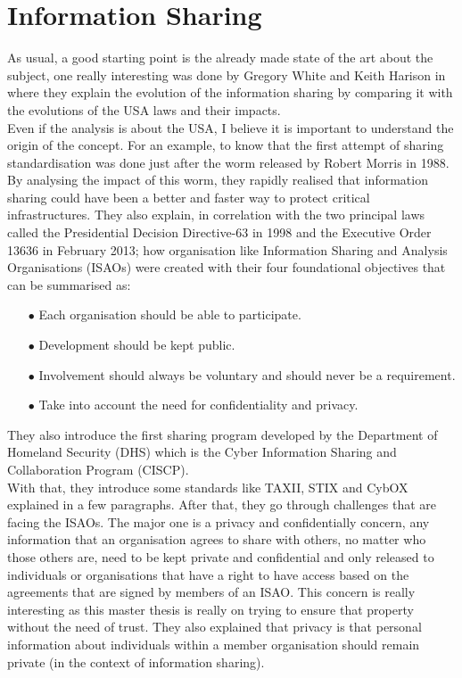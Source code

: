\documentclass{eplmastersthesis}
\begin{document}
\section{Information Sharing}
As usual, a good starting point is the already made state of the art about the subject, one really interesting was done by Gregory White and Keith Harison in \cite{white2017state} where they explain the evolution of the information sharing by comparing it with the evolutions of the USA laws and their impacts.\\
Even if the analysis is about the USA, I believe it is important to understand the origin of the concept. For an example, to know that the first attempt of sharing standardisation was done just after the worm released by Robert Morris in 1988.\\
By analysing the impact of this worm, they rapidly realised that information sharing could have been a better and faster way to protect critical infrastructures. They also explain, in correlation with the two principal laws called the Presidential Decision Directive-63 in 1998 and the Executive Order 13636 in February 2013; how organisation like Information Sharing and Analysis Organisations (ISAOs) were created with their four foundational objectives that can be summarised as:
\begin{itemize}
\item[$\bullet$] Each organisation should be able to participate.
\item[$\bullet$] Development should be kept public.
\item[$\bullet$] Involvement should always be voluntary and should never be a requirement.
\item[$\bullet$] Take into account the need for confidentiality and privacy.
\end{itemize}
They also introduce the first sharing program developed by the Department of Homeland Security (DHS) which is the Cyber Information Sharing and Collaboration Program (CISCP).\\
With that, they introduce some standards like TAXII, STIX and CybOX explained in a few paragraphs. After that, they go through challenges that are facing the ISAOs. The major one is a privacy and confidentially concern, any information that an organisation agrees to share with others, no matter who those others are, need to be kept private and confidential and only released to individuals or organisations that have a right to have access based on the agreements that are signed by members of an ISAO. This concern is really interesting as this master thesis is really on trying to ensure that property without the need of trust. They also explained that privacy is that personal information about individuals within a member organisation should remain private (in the context of information sharing).
\end{document}
